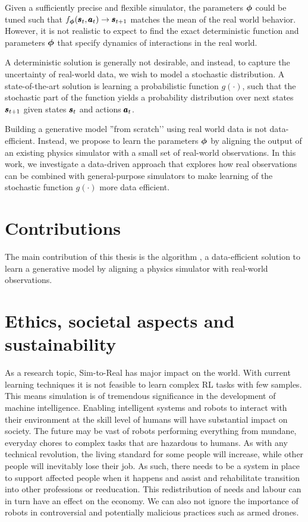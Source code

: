 Given a sufficiently precise and flexible simulator, the parameters $\boldsymbol{\phi}$ could be tuned such that $f_{\boldsymbol{\phi}}(\pmb{s}_t, \pmb{a}_t) \rightarrow \pmb{s}_{t+1}$ matches the mean of the real world behavior. However, it is not realistic to expect to find the exact deterministic function and parameters $\boldsymbol{\phi}$ that specify dynamics of interactions in the real world.

A deterministic solution is generally not desirable, and instead, to capture the uncertainty of real-world data, we wish to model a stochastic distribution. A state-of-the-art solution is learning a probabilistic function $g(\cdot)$, such that the stochastic part of the function yields a probability distribution over next states $\pmb{s}_{t+1}$ given states $\pmb{s}_t$ and actions $\pmb{a}_t$.

Building a generative model ''from scratch’' using real world data is not data-efficient. Instead, we propose to learn the parameters $\boldsymbol{\phi}$ by aligning the output of an existing physics simulator with a small set of real-world observations. In this work, we investigate a data-driven approach that explores how real observations can be combined with general-purpose simulators to make learning of the stochastic function $g(\cdot)$ more data efficient.

\section{Contributions}

The main contribution of this thesis is the algorithm \dettostoc{}, a data-efficient solution to learn a generative model by aligning a physics simulator with real-world observations.

\section{Ethics, societal aspects and sustainability}

As a research topic, Sim-to-Real has major impact on the world. With current learning techniques it is not feasible to learn complex RL tasks with few samples. This means simulation is of tremendous significance in the development of machine intelligence. Enabling intelligent systems and robots to interact with their environment at the skill level of humans will have substantial impact on society. The future may be vast of robots performing everything from mundane, everyday chores to complex tasks that are hazardous to humans. As with any technical revolution, the living standard for some people will increase, while other people will inevitably lose their job. As such, there needs to be a system in place to support affected people when it happens and assist and rehabilitate transition into other professions or reeducation. This redistribution of needs and labour can in turn have an effect on the economy. We can also not ignore the importance of robots in controversial and potentially malicious practices such as armed drones.

